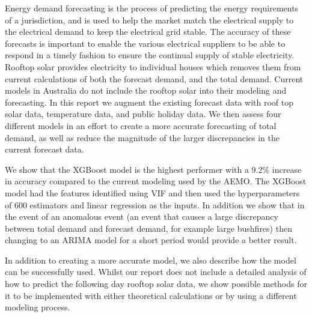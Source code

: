 \documentclass[mstat,12pt]{unswthesis}
\begin{document}


Energy demand forecasting is the process of predicting the energy
requirements of a jurisdiction, and is used to help the market match the
electrical supply to the electrical demand to keep the electrical grid
stable. The accuracy of these forecasts is important to enable the
various electrical suppliers to be able to respond in a timely fashion
to ensure the continual supply of stable electricity. Rooftop solar
provides electricity to individual houses which removes them from
current calculations of both the forecast demand, and the total demand.
Current models in Australia do not include the rooftop solar into their
modeling and forecasting. In this report we augment the existing
forecast data with roof top solar data, temperature data, and public
holiday data. We then assess four different models in an effort to
create a more accurate forecasting of total demand, as well as reduce
the magnitude of the larger discrepancies in the current forecast data.

\par

We show that the XGBoost model is the highest performer with a 9.2\%
increase in accuracy compared to the current modeling used by the AEMO.
The XGBoost model had the features identified using VIF and then used
the hyperparameters of 600 estimators and linear regression as the
inputs. In addition we show that in the event of an anomalous event (an
event that causes a large discrepancy between total demand and forecast
demand, for example large bushfires) then changing to an ARIMA model for
a short period would provide a better result.

\par

In addition to creating a more accurate model, we also describe how the
model can be successfully used. Whilst our report does not include a
detailed analysis of how to predict the following day rooftop solar
data, we show possible methods for it to be implemented with either
theoretical calculations or by using a different modeling process.



\afterpreface





%
%
\end{document}
